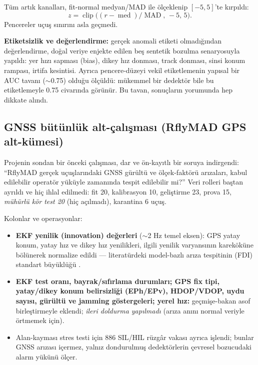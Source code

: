 \documentclass[11pt,a4paper]{article}
\begin{document}
Tüm artık kanalları, fit-normal medyan/MAD ile ölçeklenip $[-5,5]$'te kırpıldı:
\[
z = \operatorname{clip}\!\big((r - \operatorname{med})/\operatorname{MAD},\,
-5,\, 5\big).
\]
Pencereler uçuş sınırını asla geçmedi.

\textbf{Etiketsizlik ve değerlendirme:} gerçek anomali etiketi olmadığından
değerlendirme, doğal veriye enjekte edilen beş sentetik bozulma senaryosuyla
yapıldı: yer hızı sapması (bias), dikey hız donması, track donması, sinsi konum
rampası, irtifa kesintisi. Ayrıca pencere-düzeyi vekil etiketlemenin yapısal bir
AUC tavanı ($\sim$0.75) olduğu ölçüldü: mükemmel bir dedektör bile bu
etiketlemeyle 0.75 civarında görünür. Bu tavan, sonuçların yorumunda hep dikkate
alındı.

\subsection{GNSS bütünlük alt-çalışması (RflyMAD GPS alt-kümesi)}
\label{sec:gnss-veri}

Projenin sondan bir önceki çalışması, dar ve ön-kayıtlı bir soruya indirgendi:
``RflyMAD gerçek uçuşlarındaki GNSS gürültü ve ölçek-faktörü arızaları, kabul
edilebilir operatör yüküyle zamanında tespit edilebilir mi?'' Veri rolleri
baştan ayrıldı ve hiç ihlal edilmedi: fit 20, kalibrasyon 10, geliştirme 23,
prova 15, \emph{mühürlü kör test 20} (hiç açılmadı), karantina 6 uçuş.

Kolonlar ve operasyonlar:

\begin{itemize}[itemsep=2pt]
  \item \textbf{EKF yenilik (innovation) değerleri} ($\sim$2 Hz temel eksen):
        GPS yatay konum, yatay hız ve dikey hız yenilikleri, ilgili yenilik
        varyansının kareköküne bölünerek normalize edildi --- literatürdeki
        model-bazlı arıza tespitinin (FDI) standart büyüklüğü
        \cite{willsky1976survey,isermann2006fdi}.
  \item \textbf{EKF test oranı, bayrak/sıfırlama durumları; GPS fix tipi, yatay/dikey
        konum belirsizliği (EPh/EPv), HDOP/VDOP, uydu sayısı, gürültü ve jamming
        göstergeleri; yerel hız:} geçmişe-bakan asof birleştirmeyle eklendi;
        \emph{ileri doldurma yapılmadı} (arıza anını normal veriyle örtmemek
        için).
  \item Alan-kayması stres testi için 886 SIL/HIL rüzgâr vakası ayrıca işlendi;
        bunlar GNSS arızası içermez, yalnız dondurulmuş dedektörlerin çevresel
        bozucudaki alarm yükünü ölçer.
\end{itemize}
\end{document}
